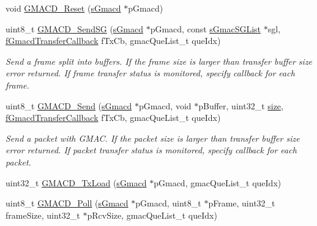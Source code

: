 \begin{DoxyCompactItemize}
void \mbox{\hyperlink{group__gmacd__defines_gaede5219eb9101a760ecb266722825318}{G\+M\+A\+C\+D\+\_\+\+Reset}} (\mbox{\hyperlink{group__gmacd__types_gaa8760917079000a5ee7fbc7fab992dd3}{s\+Gmacd}} $\ast$p\+Gmacd)
\item 
uint8\+\_\+t \mbox{\hyperlink{group__gmacd__defines_ga4dade176be1ff02c5dfb6371d873b5ed}{G\+M\+A\+C\+D\+\_\+\+Send\+SG}} (\mbox{\hyperlink{group__gmacd__types_gaa8760917079000a5ee7fbc7fab992dd3}{s\+Gmacd}} $\ast$p\+Gmacd, const \mbox{\hyperlink{group__gmacd__types_ga97ea4785757f8d33d38ed0563d84bfa4}{s\+Gmac\+S\+G\+List}} $\ast$sgl, \mbox{\hyperlink{group__gmacd__types_ga64979042bf43f697de166e864e3259de}{f\+Gmacd\+Transfer\+Callback}} f\+Tx\+Cb, gmac\+Que\+List\+\_\+t que\+Idx)
\begin{DoxyCompactList}\small\item\em Send a frame split into buffers. If the frame size is larger than transfer buffer size error returned. If frame transfer status is monitored, specify callback for each frame. \end{DoxyCompactList}\item 
uint8\+\_\+t \mbox{\hyperlink{group__gmacd__defines_ga2f3e029556b9627258a2eb1dc4919d95}{G\+M\+A\+C\+D\+\_\+\+Send}} (\mbox{\hyperlink{group__gmacd__types_gaa8760917079000a5ee7fbc7fab992dd3}{s\+Gmacd}} $\ast$p\+Gmacd, void $\ast$p\+Buffer, uint32\+\_\+t \mbox{\hyperlink{sun4u_2tte_8h_a245260f6f74972558f61b85227df5aae}{size}}, \mbox{\hyperlink{group__gmacd__types_ga64979042bf43f697de166e864e3259de}{f\+Gmacd\+Transfer\+Callback}} f\+Tx\+Cb, gmac\+Que\+List\+\_\+t que\+Idx)
\begin{DoxyCompactList}\small\item\em Send a packet with G\+M\+AC. If the packet size is larger than transfer buffer size error returned. If packet transfer status is monitored, specify callback for each packet. \end{DoxyCompactList}\item 
uint32\+\_\+t \mbox{\hyperlink{group__gmacd__defines_ga1bd3fe40e63537dce59dd4368dce4253}{G\+M\+A\+C\+D\+\_\+\+Tx\+Load}} (\mbox{\hyperlink{group__gmacd__types_gaa8760917079000a5ee7fbc7fab992dd3}{s\+Gmacd}} $\ast$p\+Gmacd, gmac\+Que\+List\+\_\+t que\+Idx)
\item 
uint8\+\_\+t \mbox{\hyperlink{group__gmacd__defines_gaa45b1118c5a1147bde4e3026194bc965}{G\+M\+A\+C\+D\+\_\+\+Poll}} (\mbox{\hyperlink{group__gmacd__types_gaa8760917079000a5ee7fbc7fab992dd3}{s\+Gmacd}} $\ast$p\+Gmacd, uint8\+\_\+t $\ast$p\+Frame, uint32\+\_\+t frame\+Size, uint32\+\_\+t $\ast$p\+Rcv\+Size, gmac\+Que\+List\+\_\+t que\+Idx)

\end{DoxyCompactItemize}
